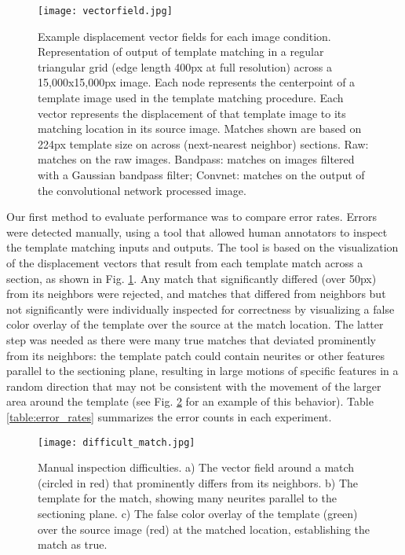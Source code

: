 \documentclass{article}
\begin{document}
\begin{figure}[h]
  \centering
  
  \texttt{[image: vectorfield.jpg]} 
  \caption{Example displacement vector fields for each image condition. Representation of output of template matching in a regular triangular grid (edge length 400px at full resolution) across a 15,000x15,000px image. Each node represents the centerpoint of a template image used in the template matching procedure. Each vector represents the displacement of that template image to its matching location in its source image. Matches shown are based on 224px template size on across (next-nearest neighbor) sections. Raw: matches on the raw images. Bandpass: matches on images filtered with a Gaussian bandpass filter; Convnet: matches on the output of the convolutional network processed image.}
  \label{vectorfield}
\end{figure}

Our first method to evaluate performance was to compare error rates. Errors were detected manually, using a tool that allowed human annotators to inspect the template matching inputs and outputs. The tool is based on the visualization of the displacement vectors that result from each template match across a section, as shown in Fig. \ref{vectorfield}. Any match that significantly differed (over 50px) from its neighbors were rejected, and matches that differed from neighbors but not significantly were individually inspected for correctness by visualizing a false color overlay of the template over the source at the match location. The latter step was needed as there were many true matches that deviated prominently from its neighbors: the template patch could contain neurites or other features parallel to the sectioning plane, resulting in large motions of specific features in a random direction that may not be consistent with the movement of the larger area around the template (see Fig. \ref{difficult_match} for an example of this behavior). Table \ref{table:error_rates} summarizes the error counts in each experiment.

\begin{figure}[h]
  \centering
  \texttt{[image: difficult\_match.jpg]}
  \caption{Manual inspection difficulties. a) The vector field around a match (circled in red) that prominently differs from its neighbors. b) The template for the match, showing many neurites parallel to the sectioning plane. c) The false color overlay of the template (green) over the source image (red) at the matched location, establishing the match as true.}
  \label{difficult_match}
\end{figure}
\end{document}
